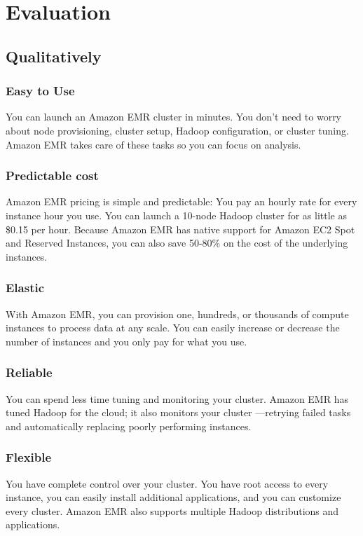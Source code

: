 

\section{Evaluation}
\label{sec:evaluation}
\subsection{Qualitatively}
\subsubsection*{Easy to Use}
You can launch an Amazon EMR cluster in minutes. You don’t need to worry about node provisioning, cluster setup, Hadoop configuration, or cluster tuning. Amazon EMR takes care of these tasks so you can focus on analysis.

\subsubsection*{Predictable cost}
Amazon EMR pricing is simple and predictable: You pay an hourly rate for every instance hour you use. You can launch a 10-node Hadoop cluster for as little as \$0.15 per hour. Because Amazon EMR has native support for Amazon EC2 Spot and Reserved Instances, you can also save 50-80\% on the cost of the underlying instances.

\subsubsection*{Elastic}
With Amazon EMR, you can provision one, hundreds, or thousands of compute instances to process data at any scale. You can easily increase or decrease the number of instances and you only pay for what you use. 

\subsubsection*{Reliable}
You can spend less time tuning and monitoring your cluster. Amazon EMR has tuned Hadoop for the cloud; it also monitors your cluster —retrying failed tasks and automatically replacing poorly performing instances.

\subsubsection*{Flexible}
You have complete control over your cluster. You have root access to every instance, you can easily install additional applications, and you can customize every cluster. Amazon EMR also supports multiple Hadoop distributions and applications.

